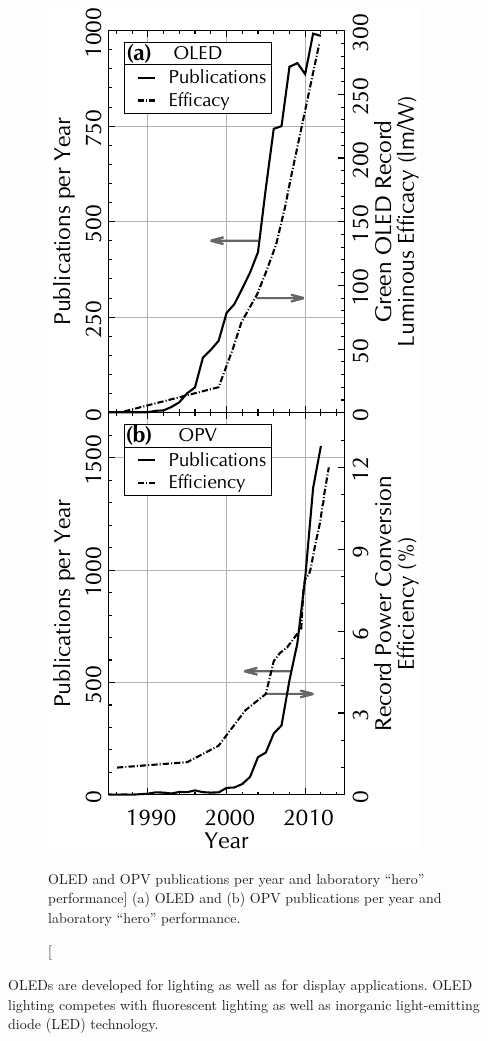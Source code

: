 \begin{figure}%
\vspace*{-0.5cm}
{\includegraphics{plot/oled+opv-pub+eff}}
\caption
[OLED and OPV publications per year and laboratory ``hero'' performance]
{(a) OLED and (b) OPV publications per year and laboratory ``hero'' performance.\cite{OW,ISI}
}
\label{fig:oled+opv-pub+eff}
\end{figure}%
%
%
OLEDs are developed for lighting as well as for display applications.
OLED lighting competes with fluorescent lighting as well as inorganic light-emitting diode (LED) technology.
